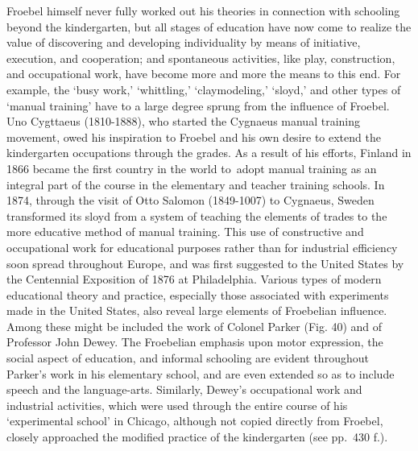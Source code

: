\documentclass[
]{book}
\begin{document}
Froebel himself never fully worked out his theories in connection with schooling beyond the kindergarten, but all stages of education have now come to realize the value of discovering and developing individuality by means of initiative, execution, and cooperation; and spontaneous activities, like play, construction, and occupational work, have become more and more the means to this end. For example, the `busy work,' `whittling,' `claymodeling,' `sloyd,' and other types of `manual training' have to a large degree sprung from the influence of Froebel. Uno Cygttaeus (1810-1888), who started the Cygnaeus manual training movement, owed his inspiration to Froebel and his own desire to extend the kindergarten occupations through the grades. As a result of his efforts, Finland in 1866 became the first country in the world to~adopt manual training as an integral part of the course in the elementary and teacher training schools. In 1874, through the visit of Otto Salomon (1849-1007) to Cygnaeus, Sweden transformed its sloyd from a system of teaching the elements of trades to the more educative method of manual training. This use of constructive and occupational work for educational purposes rather than for industrial efficiency soon spread throughout Europe, and was first suggested to the United States by the Centennial Exposition of 1876 at Philadelphia. Various types of modern educational theory and practice, especially those associated with experiments made in the United States, also reveal large elements of Froebelian influence. Among these might be included the work of Colonel Parker (Fig. 40) and of Professor John Dewey. The Froebelian emphasis upon motor expression, the social aspect of education, and informal schooling are evident throughout Parker's work in his elementary school, and are even extended so as to include speech and the language-arts. Similarly, Dewey's occupational work and industrial activities, which were used through the entire course of his `experimental school' in Chicago, although not copied directly from Froebel, closely approached the modified practice of the kindergarten (see pp.~430 f.).
\end{document}
